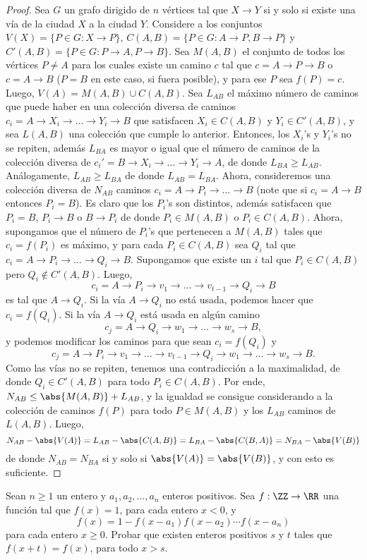 \begin{proof}
	Sea $G$ un grafo dirigido de $n$ vértices tal que $X\to Y$ si y solo si existe una vía de la ciudad $X$ a la ciudad $Y$. Considere a los conjuntos $V(X)=\{P\in G:X\to P\}$, $C(A,B)=\{P\in G:A\to P,B\to P\}$ y $C'(A,B)=\{P\in G:P\to A,P\to B\}$. Sea $M(A,B)$ el conjunto de todos los vértices $P\ne A$ para los cuales existe un camino $c$ tal que $c=A\to P\to B$ o $c=A\to B$ ($P=B$ en este caso, si fuera posible), y para ese $P$ sea $f(P)=c$. Luego, $V(A)=M(A,B)\cup C(A,B)$. Sea $L_{AB}$ el máximo número de caminos que puede haber en una colección diversa de caminos $c_i=A\to X_i\to\dots\to Y_i\to B$ que satisfacen $X_i\in C(A,B)$ y $Y_i\in C'(A,B)$, y sea $L(A,B)$ una colección que cumple lo anterior. Entonces, los $X_i$'s y $Y_i$'s no se repiten, además $L_{BA}$ es mayor o igual que el número de caminos de la colección diversa de $c_i'=B\to X_i\to\dots\to Y_i\to A$, de donde $L_{BA}\ge L_{AB}$. Análogamente, $L_{AB}\ge L_{BA}$ de donde $L_{AB}=L_{BA}$. Ahora, consideremos una colección diversa de $N_{AB}$ caminos $c_i=A\to P_i\to\dots\to B$ (note que si $c_i=A\to B$ entonces $P_i=B$). Es claro que los $P_i$'s son distintos, además satisfacen que $P_i=B$, $P_i\to B$ o $B\to P_i$ de donde $P_i\in M(A,B)$ o $P_i\in C(A,B)$. Ahora, supongamos que el número de $P_i$'s que pertenecen a $M(A,B)$ tales que $c_i=f(P_i)$ es máximo, y para cada $P_i\in C(A,B)$ sea $Q_i$ tal que $c_i=A\to P_i\to\dots\to Q_i\to B$. Supongamos que existe un $i$ tal que $P_i\in C(A,B)$ pero $Q_i\not\in C'(A,B)$. Luego,
	\[c_i=A\to P_i\to v_1\to\dots\to v_{t-1}\to Q_i\to B\]
	es tal que $A\to Q_i$. Si la vía $A\to Q_i$ no está usada, podemos hacer que $c_i=f(Q_i)$. Si la vía $A\to Q_i$ está usada en algún camino
	\[c_j=A\to Q_i\to w_1\to\dots\to w_s\to B,\]
	y podemos modificar los caminos para que sean $c_i=f(Q_i)$ y
	\[c_j=A\to P_i\to v_1\to\dots\to v_{t-1}\to Q_i\to w_1\to\dots\to w_s\to B.\]
	Como las vías no se repiten, tenemos una contradicción a la maximalidad, de donde $Q_i\in C'(A,B)$ para todo $P_i\in C(A,B)$. Por ende, $N_{AB}\le\abs{M(A,B)}+L_{AB}$, y la igualdad se consigue considerando a la colección de caminos $f(P)$ para todo $P\in M(A,B)$ y los $L_{AB}$ caminos de $L(A,B)$. Luego,
	\[N_{AB}-\abs{V(A)}=L_{AB}-\abs{C(A,B)}=L_{BA}-\abs{C(B,A)}=N_{BA}-\abs{V(B)}\]
	de donde $N_{AB}=N_{BA}$ si y solo si $\abs{V(A)}=\abs{V(B)}$, y con esto es suficiente.
\end{proof}


\begin{problem}
	Sean $n\ge 1$ un entero y $a_1,a_2,\dots,a_n$ enteros positivos. Sea $f:\ZZ\to\RR$ una función tal que $f(x)=1$, para cada entero $x<0$, y
	\[f(x)=1-f(x-a_1)f(x-a_2)\cdots f(x-a_n)\]
	para cada entero $x\ge 0$. Probar que existen enteros positivos $s$ y $t$ tales que $f(x+t)=f(x)$, para todo $x>s$.
\end{problem}

